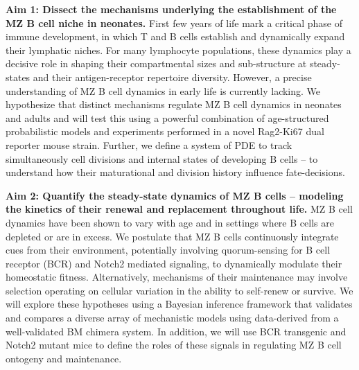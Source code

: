 \documentclass[11pt]{article}
\begin{document}
\textbf{Aim 1: Dissect the mechanisms underlying the establishment of the MZ B cell niche in neonates.} 
First few years of life mark a critical phase of immune development, in which T and B cells establish and dynamically expand their lymphatic niches.
For many lymphocyte populations, these dynamics play a decisive role in shaping their compartmental sizes and sub-structure at steady-states and their antigen-receptor repertoire diversity.
However, a precise understanding of MZ B cell dynamics in early life is currently lacking.
We hypothesize that distinct mechanisms regulate MZ B cell dynamics in neonates and adults and will test this using a powerful combination of age-structured probabilistic models and experiments performed in a novel Rag2-Ki67 dual reporter mouse strain. %
Further, we define a system of PDE to track simultaneously cell divisions and internal states of developing B cells -- to understand how their maturational and division history influence fate-decisions.


\textbf{Aim 2: Quantify the steady-state dynamics of MZ B cells -- modeling the kinetics of their renewal and replacement throughout life.} 
MZ B cell dynamics have been shown to vary with age and in settings where B cells are depleted or are in excess.
We postulate that MZ B cells continuously integrate cues from their environment, potentially involving quorum-sensing for B cell receptor (BCR) and Notch2 mediated signaling, to dynamically modulate their homeostatic fitness.
Alternatively, mechanisms of their maintenance may involve selection operating on cellular variation in the ability to self-renew or survive.
We will explore these hypotheses using a Bayesian inference framework that validates and compares a diverse array of mechanistic models using data-derived from a well-validated BM chimera system.
In addition, we will use BCR transgenic and Notch2 mutant mice to define the roles of these signals in regulating MZ B cell ontogeny and maintenance.
\end{document}
